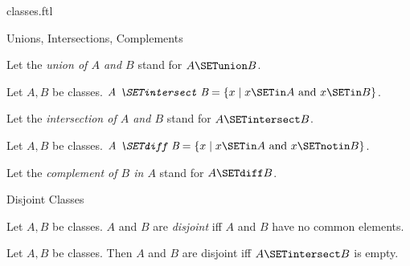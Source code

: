 \documentclass{stex}
\begin{document}
\begin{smodule}{classes.ftl}
\begin{sfragment}{Unions, Intersections, Complements}
\begin{definition}[forthel,id=FOUNDATIONS_01_2159753924968448]
    Let the \emph{union of $A$ and $B$} stand for $A \SETunion B$.
  \end{definition}

  \begin{definition}[forthel,id=FOUNDATIONS_01_5744033011859456]
    Let $A, B$ be classes.
    $\emph{A \SETintersect B} = \{ x \mid x \SETin A\text{ and }x \SETin B \}$.

    Let the \emph{intersection of $A$ and $B$} stand for $A \SETintersect B$.
  \end{definition}

  \begin{definition}[forthel,id=FOUNDATIONS_01_7620345041256448]
    Let $A, B$ be classes.
    $\emph{A \SETdiff B} = \{ x \mid x \SETin A\text{ and }x \SETnotin B \}$.

    Let the \emph{complement of $B$ in $A$} stand for $A \SETdiff B$.
  \end{definition}
\end{sfragment}

\begin{sfragment}{Disjoint Classes}
  \begin{definition}[forthel,id=FOUNDATIONS_01_4981913324355584]
    Let $A, B$ be classes.
    $A$ and $B$ are \emph{disjoint} iff $A$ and $B$ have no common elements.
  \end{definition}

  \begin{proposition}[forthel,id=FOUNDATIONS_01_1211191546347520]
    Let $A, B$ be classes.
    Then $A$ and $B$ are disjoint iff $A \SETintersect B$ is empty.
  \end{proposition}
\end{sfragment}
\end{smodule}
\end{document}
